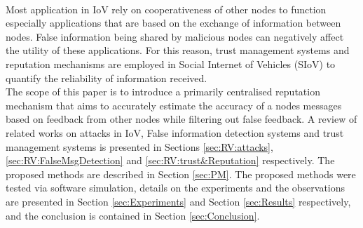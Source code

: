 \documentclass[journal]{IEEEtran}
\begin{document}
\\Most application in IoV rely on cooperativeness of other nodes to function especially applications that are based on the exchange of information between nodes. False information being shared by malicious nodes can negatively affect the utility of these applications. For this reason, trust management systems and reputation mechanisms are employed in Social Internet of Vehicles (SIoV) to quantify the reliability of information received.
\\ The scope of this paper is to introduce a primarily centralised reputation mechanism that aims to accurately estimate the accuracy of a nodes messages based on feedback from other nodes while filtering out false feedback. A review of related works on attacks in IoV, False information detection systems and trust management systems is presented in Sections \ref{sec:RV:attacks}, \ref{sec:RV:FalseMsgDetection} and \ref{sec:RV:trust&Reputation} respectively. The proposed methods are described in Section \ref{sec:PM}. The proposed methods were tested via software simulation, details on the experiments and the observations are presented in Section \ref{sec:Experiments} and Section \ref{sec:Results} respectively, and the conclusion is contained in Section \ref{sec:Conclusion}.

 





%
%
\end{document}
